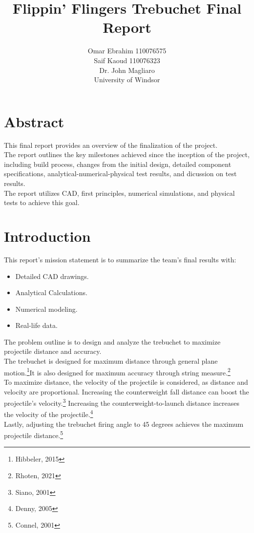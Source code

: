 \documentclass[12pt, titlepage]{article}
\title{Flippin' Flingers Trebuchet Final Report}
\author{Omar Ebrahim 110076575\\Saif Kaoud 110076323\\[10pt] Dr. John Magliaro\\
University of Windsor}
\begin{document}
    \maketitle
    \section{Abstract}
    This final report provides an overview of the finalization of the project.\\[10pt]
    The report outlines the key milestones achieved since the inception of the project, 
    including build process, changes from the initial design, detailed component specifications, analytical-numerical-physical test results, and dicussion on test results.\\[10pt]
    The report utilizes CAD, first principles, numerical simulations, and physical tests to achieve this goal.
    \newpage
    \tableofcontents
    \listoffigures
    \newpage
    \section{Introduction}
    This report's mission statement is to summarize the team's final results with:
    \begin{itemize}
        \item Detailed CAD drawings.
        \item Analytical Calculations.
        \item Numerical modeling.
        \item Real-life data.
    \end{itemize}
    The problem outline is to design and analyze the trebuchet to maximize
    projectile distance and accuracy.\\[10pt]
    The trebuchet is designed for maximum distance through general
    plane motion.\footnote{Hibbeler, 2015}It is also designed for maximum 
    accuracy through string measure.\footnote{Rhoten, 2021}\\[10pt]
    To maximize distance, the velocity of the projectile is considered, as
    distance and velocity are proportional. Increasing the counterweight 
    fall distance can boost the projectile's velocity.\footnote{Siano, 2001}
    Increasing the counterweight-to-launch distance increases the velocity 
    of the projectile.\footnote{Denny, 2005}\\[10pt]
    Lastly, adjusting the trebuchet firing angle to 
    45 degrees achieves the maximum projectile distance.\footnote{Connel, 2001}
    \newpage
\end{document}
